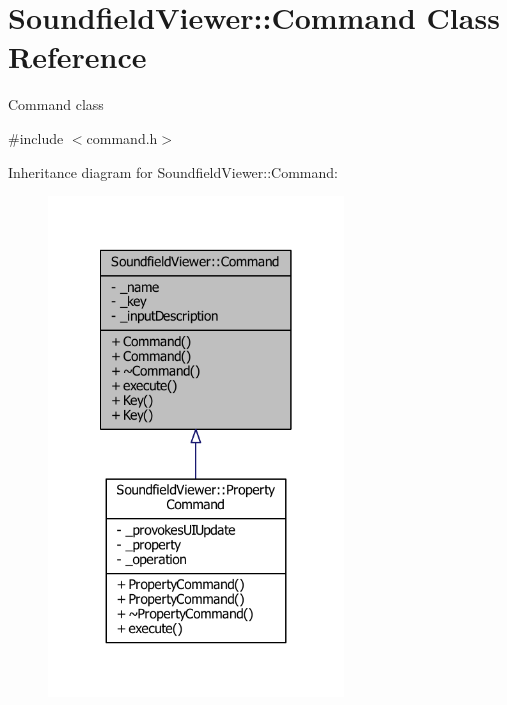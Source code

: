 \section{Soundfield\-Viewer\-:\-:Command Class Reference}
\label{classSoundfieldViewer_1_1Command}


Command class  




{\ttfamily \#include $<$command.\-h$>$}



Inheritance diagram for Soundfield\-Viewer\-:\-:Command\-:\nopagebreak
\begin{figure}[H]
\begin{center}
\leavevmode
\includegraphics[width=222pt]{d4/d60/classSoundfieldViewer_1_1Command__inherit__graph}
\end{center}
\end{figure}


